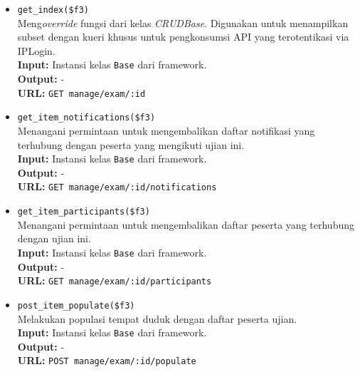 \begin{itemize}
\begin{itemize}
                \item \texttt{get\_index(\$f3)} \\
                    Meng\textit{override} fungsi dari kelas \textit{CRUDBase}. Digunakan
                    untuk menampilkan subset dengan kueri khusus untuk pengkonsumsi API
                    yang terotentikasi via IPLogin.\\
                    \textbf{Input:} Instansi kelas \texttt{Base} dari framework.\\
                    \textbf{Output:} -\\
                    \textbf{URL:} \texttt{GET manage/exam/:id}
                
                \item \texttt{get\_item\_notifications(\$f3)} \\
                    Menangani permintaan untuk mengembalikan daftar notifikasi yang terhubung
                    dengan peserta yang mengikuti ujian ini.\\
                    \textbf{Input:} Instansi kelas \texttt{Base} dari framework.\\
                    \textbf{Output:} -\\
                    \textbf{URL:} \texttt{GET manage/exam/:id/notifications}
                
                \item \texttt{get\_item\_participants(\$f3)} \\
                    Menangani permintaan untuk mengembalikan daftar peserta yang terhubung
                    dengan ujian ini.\\
                    \textbf{Input:} Instansi kelas \texttt{Base} dari framework.\\
                    \textbf{Output:} -\\
                    \textbf{URL:} \texttt{GET manage/exam/:id/participants}
                
                \item \texttt{post\_item\_populate(\$f3)} \\
                    Melakukan populasi tempat duduk dengan daftar peserta ujian.\\
                    \textbf{Input:} Instansi kelas \texttt{Base} dari framework.\\
                    \textbf{Output:} -\\
                    \textbf{URL:} \texttt{POST manage/exam/:id/populate}
                

\end{itemize}
\end{itemize}
